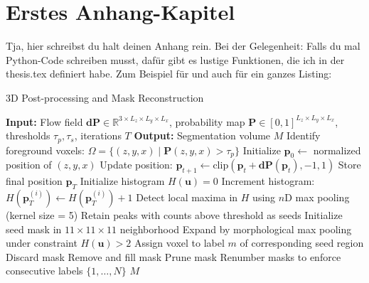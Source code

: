 

\chapter{Erstes Anhang-Kapitel} \label{anhang_1}

Tja, hier schreibst du halt deinen Anhang rein. Bei der Gelegenheit: Falls du mal Python-Code schreiben musst, dafür gibt es lustige Funktionen, die ich in der thesis.tex definiert habe. Zum Beispiel für  und auch für ein ganzes Listing:


\begin{algorithm}
\caption{3D Post-processing and Mask Reconstruction}
\label{algo:maskrecon}
\begin{algorithmic}[1]
\STATE \textbf{Input:} Flow field $\mathbf{dP} \in \mathbb{R}^{3 \times L_z \times L_y \times L_x}$, probability map $\mathbf{P} \in [0,1]^{L_z \times L_y \times L_x}$, thresholds $\tau_p, \tau_s$, iterations $T$
\STATE \textbf{Output:} Segmentation volume $M$
\STATE Identify foreground voxels: $\Omega = \{ (z,y,x) \mid \mathbf{P}(z,y,x) > \tau_p \}$
    \STATE Initialize $\mathbf{p}_0 \gets$ normalized position of $(z,y,x)$
        \STATE Update position: $\mathbf{p}_{t+1} \gets \mathrm{clip}(\mathbf{p}_t + \mathbf{dP}(\mathbf{p}_t), -1, 1)$
    \ENDFOR
    \STATE Store final position $\mathbf{p}_T$
\ENDFOR
\STATE Initialize histogram $H(\mathbf{u}) = 0$
    \STATE Increment histogram: $H(\mathbf{p}_T^{(i)}) \gets H(\mathbf{p}_T^{(i)}) + 1$
\ENDFOR
\STATE Detect local maxima in $H$ using $n$D max pooling (kernel size = 5)
\STATE Retain peaks with counts above threshold as seeds
    \STATE Initialize seed mask in $11 \times 11 \times 11$ neighborhood
    \STATE Expand by morphological max pooling under constraint $H(\mathbf{u}) > 2$
\ENDFOR
{}
    \STATE Assign voxel to label $m$ of corresponding seed region
\ENDFOR
{}
        \STATE Discard mask
        \STATE Remove and fill mask
        \STATE Prune mask
    \ENDIF
\ENDFOR
\STATE Renumber masks to enforce consecutive labels $\{1,\dots,N\}$
\RETURN $M$
\end{algorithmic}
\end{algorithm}